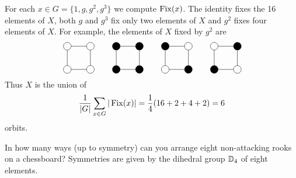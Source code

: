 \begin{example}
For each $x\in G=\{1,g,g^2,g^3\}$ we compute $\operatorname{Fix}(x)$. The identity fixes 
the 16 elements of $X$, both 
$g$ and  $g^3$ fix only two elements of $X$ and 
$g^2$ fixes four elements of $X$. For example, 
the elements of $X$ fixed by $g^2$ are 
\[
\begin{tikzpicture}
    \node[shape=circle,draw=black] (A) at (1,0){};
    \node[shape=circle,draw=black] (B) at (1,1){};
    \node[shape=circle,draw=black] (C) at (0,1){}; 
    \node[shape=circle,draw=black] (D) at (0,0){};
    \path [-](A) edge node[left]{} (B);
    \path [-](B) edge node[left]{} (C);
    \path [-](C) edge node[left]{} (D);
    \path [-](D) edge node[left]{} (A);
\end{tikzpicture}
\qquad
\begin{tikzpicture}
    \node[shape=circle,draw=black,fill=black] (A) at (1,0) {};
    \node[shape=circle,draw=black,fill=black] (B) at (1,1) {};
    \node[shape=circle,draw=black,fill=black] (C) at (0,1) {};
    \node[shape=circle,draw=black,fill=black] (D) at (0,0) {};
    \path [-](A) edge node[left]{} (B);
    \path [-](B) edge node[left]{} (C);
    \path [-](C) edge node[left]{} (D);
    \path [-](D) edge node[left]{} (A);
\end{tikzpicture}
\qquad
\begin{tikzpicture}
    \node[shape=circle,draw=black,fill=black] (A) at (1,0) {};
    \node[shape=circle,draw=black] (B) at (1,1) {};
    \node[shape=circle,draw=black,fill=black] (C) at (0,1) {};
    \node[shape=circle,draw=black] (D) at (0,0) {};
    \path [-](A) edge node[left]{} (B);
    \path [-](B) edge node[left]{} (C);
    \path [-](C) edge node[left]{} (D);
    \path [-](D) edge node[left]{} (A);
\end{tikzpicture}
\qquad
\begin{tikzpicture}
    \node[shape=circle,draw=black] (A) at (1,0) {};
    \node[shape=circle,draw=black,fill=black] (B) at (1,1) {};
    \node[shape=circle,draw=black] (C) at (0,1) {};
    \node[shape=circle,draw=black,fill=black] (D) at (0,0) {};
    \path [-](A) edge node[left]{} (B);
    \path [-](B) edge node[left]{} (C);
    \path [-](C) edge node[left]{} (D);
    \path [-](D) edge node[left]{} (A);
\end{tikzpicture}
\]
Thus $X$ is the union of  
\[
\frac{1}{|G|}\sum_{x\in G}|\operatorname{Fix}(x)|=\frac{1}{4}(16+2+4+2)=6
\]
orbits. 
\end{example}

\begin{bonus}
    In how many ways (up to symmetry) can you
    arrange eight non-attacking rooks on a chessboard? Symmetries 
    are given by the dihedral group $\mathbb{D}_4$ of eight elements.
\end{bonus}


